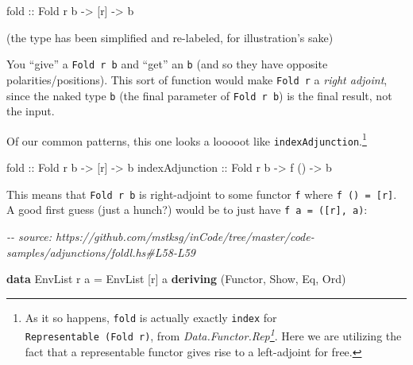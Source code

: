 \documentclass[]{article}
\newenvironment{Shaded}{}{}
\newcommand{\CommentTok}[1]{\textcolor[rgb]{0.38,0.63,0.69}{\textit{#1}}}
\newcommand{\DataTypeTok}[1]{\textcolor[rgb]{0.56,0.13,0.00}{#1}}
\newcommand{\KeywordTok}[1]{\textcolor[rgb]{0.00,0.44,0.13}{\textbf{#1}}}
\newcommand{\NormalTok}[1]{#1}
\newcommand{\OtherTok}[1]{\textcolor[rgb]{0.00,0.44,0.13}{#1}}
\renewcommand{\href}[2]{#2\footnote{\url{#1}}}
\begin{document}
\begin{Shaded}
\begin{Highlighting}[]
\OtherTok{fold ::} \DataTypeTok{Fold}\NormalTok{ r b }\OtherTok{{-}>}\NormalTok{ [r] }\OtherTok{{-}>}\NormalTok{ b}
\end{Highlighting}
\end{Shaded}

(the type has been simplified and re-labeled, for illustration's sake)

You ``give'' a \texttt{Fold\ r\ b} and ``get'' an \texttt{b} (and so they have
opposite polarities/positions). This sort of function would make
\texttt{Fold\ r} a \emph{right adjoint}, since the naked type \texttt{b} (the
final parameter of \texttt{Fold\ r\ b}) is the final result, not the input.

Of our common patterns, this one looks a looooot like
\texttt{indexAdjunction}.\footnote{As it so happens, \texttt{fold} is actually
  exactly \texttt{index} for \texttt{Representable\ (Fold\ r)}, from
  \emph{\href{https://hackage.haskell.org/package/adjunctions/docs/Data-Functor-Rep.html}{Data.Functor.Rep}}.
  Here we are utilizing the fact that a representable functor gives rise to a
  left-adjoint for free.}

\begin{Shaded}
\begin{Highlighting}[]
\OtherTok{fold            ::} \DataTypeTok{Fold}\NormalTok{ r b }\OtherTok{{-}>}\NormalTok{ [r]  }\OtherTok{{-}>}\NormalTok{ b}
\OtherTok{indexAdjunction ::} \DataTypeTok{Fold}\NormalTok{ r b }\OtherTok{{-}>}\NormalTok{ f () }\OtherTok{{-}>}\NormalTok{ b}
\end{Highlighting}
\end{Shaded}

This means that \texttt{Fold\ r\ b} is right-adjoint to some functor \texttt{f}
where \texttt{f\ ()\ =\ {[}r{]}}. A good first guess (just a hunch?) would be to
just have \texttt{f\ a\ =\ ({[}r{]},\ a)}:

\begin{Shaded}
\begin{Highlighting}[]
\CommentTok{{-}{-} source: https://github.com/mstksg/inCode/tree/master/code{-}samples/adjunctions/foldl.hs\#L58{-}L59}

\KeywordTok{data} \DataTypeTok{EnvList}\NormalTok{ r a }\OtherTok{=} \DataTypeTok{EnvList}\NormalTok{ [r] a}
  \KeywordTok{deriving}\NormalTok{ (}\DataTypeTok{Functor}\NormalTok{, }\DataTypeTok{Show}\NormalTok{, }\DataTypeTok{Eq}\NormalTok{, }\DataTypeTok{Ord}\NormalTok{)}
\end{Highlighting}
\end{Shaded}
\end{document}
